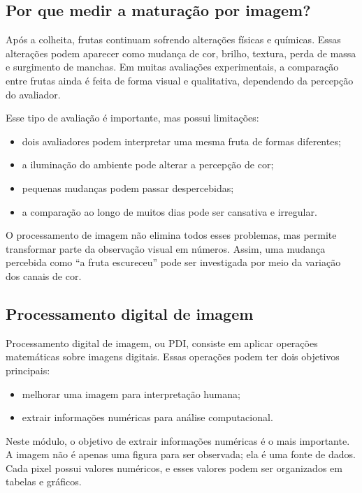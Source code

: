\documentclass[12pt]{article}
\begin{document}
\subsection{Por que medir a maturação por imagem?}

Após a colheita, frutas continuam sofrendo alterações físicas e químicas. Essas alterações podem aparecer como mudança de cor, brilho, textura, perda de massa e surgimento de manchas. Em muitas avaliações experimentais, a comparação entre frutas ainda é feita de forma visual e qualitativa, dependendo da percepção do avaliador.

Esse tipo de avaliação é importante, mas possui limitações:

\begin{itemize}
  \item dois avaliadores podem interpretar uma mesma fruta de formas diferentes;
  \item a iluminação do ambiente pode alterar a percepção de cor;
  \item pequenas mudanças podem passar despercebidas;
  \item a comparação ao longo de muitos dias pode ser cansativa e irregular.
\end{itemize}

O processamento de imagem não elimina todos esses problemas, mas permite transformar parte da observação visual em números. Assim, uma mudança percebida como ``a fruta escureceu'' pode ser investigada por meio da variação dos canais de cor.

\subsection{Processamento digital de imagem}

Processamento digital de imagem, ou PDI, consiste em aplicar operações matemáticas sobre imagens digitais. Essas operações podem ter dois objetivos principais:

\begin{itemize}
  \item melhorar uma imagem para interpretação humana;
  \item extrair informações numéricas para análise computacional.
\end{itemize}

Neste módulo, o objetivo de extrair informações numéricas é o mais importante. A imagem não é apenas uma figura para ser observada; ela é uma fonte de dados. Cada pixel possui valores numéricos, e esses valores podem ser organizados em tabelas e gráficos.
\end{document}
